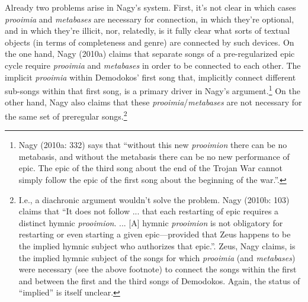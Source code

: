 \documentclass[12pt]{article}
\begin{document}
Already two problems arise in Nagy's system. First, it's not clear in which cases \textit{prooimia} and \textit{metabases} are necessary for connection, in which they're optional, and in which they're illicit, nor, relatedly, is it fully clear what sorts of textual objects (in terms of completeness and genre) are connected by such devices. On the one hand, Nagy (2010a) claims that separate songs of a pre-regularized epic cycle require \textit{prooimia} and \textit{metabases} in order to be connected to each other. The implicit \textit{prooimia} within Demodokos' first song that, implicitly connect different sub-songs within that first song, is a primary driver in Nagy's argument.\footnote{ Nagy (2010a: 332) says that ``without this new \textit{prooimion} there can be no metabasis, and without the metabasis there can be no new performance of epic. The epic of the third song about the end of the Trojan War cannot simply follow the epic of the first song about the beginning of the war.''.} On the other hand, Nagy also claims that these \textit{prooimia}/\textit{metabases} are not necessary for the same set of preregular songs.\footnote{ I.e., a diachronic argument wouldn't solve the problem. Nagy (2010b: 103) claims that ``It does not follow ... that each restarting of epic requires a distinct hymnic \textit{prooimion}. ... [A] hymnic \textit{prooimion} is not obligatory for restarting or even starting a given epic---provided that Zeus happens to be the implied hymnic subject who authorizes that epic.''. Zeus, Nagy claims, is the implied hymnic subject of the songs for which \textit{prooimia} (and \textit{metabases}) were necessary (see the above footnote) to connect the songs within the first and between the first and the third songs of Demodokos. Again, the status of ``implied'' is itself unclear.}
\end{document}

